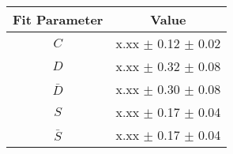 \begin{tabular}{c r } 
\hline
\hline
Fit Parameter & \multicolumn{1}{c}{Value}  \\ 
\hline
$C$ & x.xx $\pm$ 0.12 $\pm$ 0.02 \\ 
$D$ & x.xx $\pm$ 0.32 $\pm$ 0.08 \\ 
$\bar{D}$ & x.xx $\pm$ 0.30 $\pm$ 0.08 \\ 
$S$ & x.xx $\pm$ 0.17 $\pm$ 0.04 \\ 
$\bar{S}$ & x.xx $\pm$ 0.17 $\pm$ 0.04 \\ 
\hline
\hline
\end{tabular}
